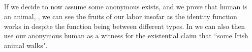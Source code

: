 \begin{code}%
\>[0]\AgdaSpace{}%
\AgdaSymbol{:}\AgdaSpace{}%
\AgdaSpace{}%
\AgdaSpace{}%
\AgdaSpace{}%
\AgdaSpace{}%
\AgdaSpace{}%
\AgdaSpace{}%
\<%
\\
\>[0]\AgdaSpace{}%
\AgdaSymbol{(}\AgdaSpace{}%
\AgdaSpace{}%
\AgdaSpace{}%
\AgdaOperator{\AgdaInductiveConstructor{,}}\AgdaSpace{}%
\AgdaSymbol{)}\AgdaSpace{}%
\AgdaSymbol{=}\AgdaSpace{}%
\AgdaSymbol{(}\AgdaSpace{}%
\AgdaSymbol{(}\AgdaSpace{}%
\AgdaSymbol{)}\AgdaSpace{}%
\AgdaSymbol{)}\AgdaSpace{}%
\AgdaOperator{\AgdaInductiveConstructor{,}}\AgdaSpace{}%
\<%
\\
%
\\[\AgdaEmptyExtraSkip]%
\>[0]\AgdaSpace{}%
\AgdaSymbol{:}\AgdaSpace{}%
\AgdaSpace{}%
\AgdaSpace{}%
\AgdaSpace{}%
\AgdaSpace{}%
\AgdaSpace{}%
\AgdaSpace{}%
\<%
\\
\>[0]\AgdaSpace{}%
\AgdaSymbol{(}\AgdaSpace{}%
\AgdaSpace{}%
\AgdaSpace{}%
\AgdaOperator{\AgdaInductiveConstructor{,}}\AgdaSpace{}%
\AgdaSymbol{)}\AgdaSpace{}%
\AgdaSymbol{=}\AgdaSpace{}%
\AgdaSymbol{(}\AgdaSpace{}%
\AgdaSymbol{)}\AgdaSpace{}%
\AgdaOperator{\AgdaInductiveConstructor{,}}\AgdaSpace{}%
\<%
\end{code}

If we decide to now assume some anonymous  exists, and we prove
that human is an animal, , we can see the fruits of our labor
insofar as the identity function works in  despite the function being
between different types. In  we can also then use our anonymous
human as a witness for the existential claim that ``some Irish animal walks".


